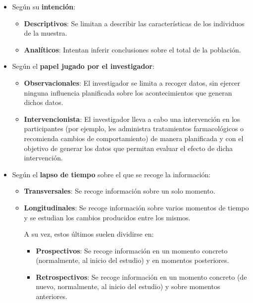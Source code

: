 \documentclass[
  letterpaper,
  DIV=11,
  numbers=noendperiod]{scrreprt}
\begin{document}
\begin{itemize}
\item
  Según su \textbf{intención}:

  \begin{itemize}
  \item
    \textbf{Descriptivos}: Se limitan a describir las características de
    los individuos de la muestra.
  \item
    \textbf{Analíticos}: Intentan inferir conclusiones sobre el total de
    la población.
  \end{itemize}
\item
  Según el \textbf{papel jugado por el investigador}:

  \begin{itemize}
  \item
    \textbf{Observacionales}: El investigador se limita a recoger datos,
    sin ejercer ninguna influencia planificada sobre los acontecimientos
    que generan dichos datos.
  \item
    \textbf{Intervencionista}: El investigador lleva a cabo una
    intervención en los participantes (por ejemplo, les administra
    tratamientos farmacológicos o recomienda cambios de comportamiento)
    de manera planificada y con el objetivo de generar los datos que
    permitan evaluar el efecto de dicha intervención.
  \end{itemize}
\item
  Según el \textbf{lapso de tiempo} sobre el que se recoge la
  información:

  \begin{itemize}
  \item
    \textbf{Transversales}: Se recoge información sobre un solo momento.
  \item
    \textbf{Longitudinales}: Se recoge información sobre varios momentos
    de tiempo y se estudian los cambios producidos entre los mismos.

    A su vez, estos últimos suelen dividirse en:

    \begin{itemize}
    \item
      \textbf{Prospectivos}: Se recoge información en un momento
      concreto (normalmente, al inicio del estudio) y en momentos
      posteriores.
    \item
      \textbf{Retrospectivos}: Se recoge información en un momento
      concreto (de nuevo, normalmente, al inicio del estudio) y sobre
      momentos anteriores.
    \end{itemize}
  \end{itemize}
\end{itemize}
\end{document}
